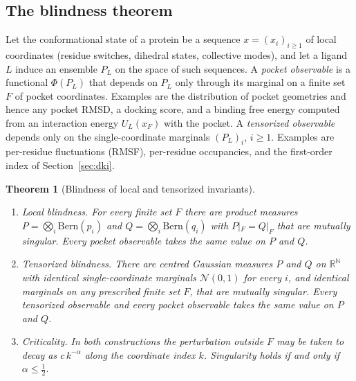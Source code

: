 \documentclass[11pt,reqno]{amsart}
\theoremstyle{plain}
\newtheorem{theorem}{Theorem}[section]
\theoremstyle{definition}
\theoremstyle{remark}
\numberwithin{equation}{section}
\newcommand{\N}{\mathbb{N}}
\newcommand{\Rr}{\mathbb{R}}
\begin{document}
\subsection*{The blindness theorem}
Let the conformational state of a protein be a sequence $x=(x_i)_{i\ge1}$ of local coordinates (residue switches, dihedral states, collective modes), and let a ligand $L$ induce an ensemble $P_L$ on the space of such sequences. A \emph{pocket observable} is a functional $\Phi(P_L)$ that depends on $P_L$ only through its marginal on a finite set $F$ of pocket coordinates. Examples are the distribution of pocket geometries and hence any pocket RMSD, a docking score, and a binding free energy computed from an interaction energy $U_L(x_F)$ with the pocket. A \emph{tensorized observable} depends only on the single-coordinate marginals $(P_L)_i$, $i\ge1$. Examples are per-residue fluctuations (RMSF), per-residue occupancies, and the first-order index of Section~\ref{sec:dki}.

\begin{theorem}[Blindness of local and tensorized invariants]\label{thm:blind}
\begin{enumerate}[label=\textup{(\arabic*)},leftmargin=*]
\item \emph{Local blindness.} For every finite set $F$ there are product measures $P=\bigotimes_i\mathrm{Bern}(p_i)$ and $Q=\bigotimes_i\mathrm{Bern}(q_i)$ with $P|_F=Q|_F$ that are mutually singular. Every pocket observable takes the same value on $P$ and $Q$.
\item \emph{Tensorized blindness.} There are centred Gaussian measures $P$ and $Q$ on $\Rr^{\N}$ with identical single-coordinate marginals $\mathcal N(0,1)$ for every $i$, and identical marginals on any prescribed finite set $F$, that are mutually singular. Every tensorized observable and every pocket observable takes the same value on $P$ and $Q$.
\item \emph{Criticality.} In both constructions the perturbation outside $F$ may be taken to decay as $c\,k^{-\alpha}$ along the coordinate index $k$. Singularity holds if and only if $\alpha\le\tfrac12$.
\end{enumerate}
\end{theorem}
\end{document}
